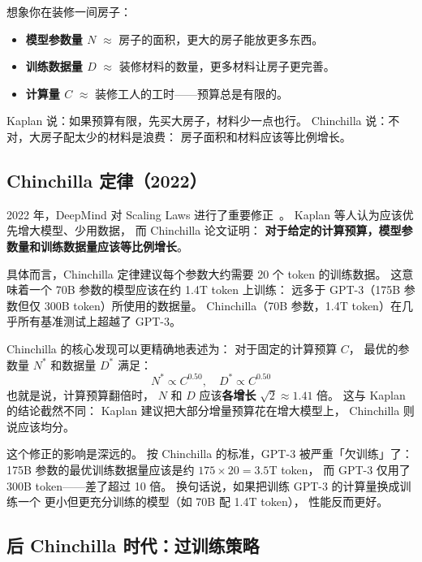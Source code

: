 \begin{keybox}
想象你在装修一间房子：
\begin{itemize}[noitemsep]
  \item \textbf{模型参数量 $N$} $\approx$ 房子的面积，更大的房子能放更多东西。
  \item \textbf{训练数据量 $D$} $\approx$ 装修材料的数量，更多材料让房子更完善。
  \item \textbf{计算量 $C$} $\approx$ 装修工人的工时——预算总是有限的。
\end{itemize}
Kaplan 说：如果预算有限，先买大房子，材料少一点也行。
Chinchilla 说：不对，大房子配太少的材料是浪费：
房子面积和材料应该等比例增长。
\end{keybox}

\subsection{Chinchilla 定律（2022）}

2022 年，DeepMind 对 Scaling Laws 进行了重要修正~\cite{hoffmann2022chinchilla}。
Kaplan 等人认为应该优先增大模型、少用数据，
而 Chinchilla 论文证明：
\textbf{对于给定的计算预算，模型参数量和训练数据量应该等比例增长}。

具体而言，Chinchilla 定律建议每个参数大约需要 20 个 token 的训练数据。
这意味着一个 70B 参数的模型应该在约 1.4T token 上训练：
远多于 GPT-3（175B 参数但仅 300B token）所使用的数据量。
Chinchilla（70B 参数，1.4T token）在几乎所有基准测试上超越了 GPT-3。

Chinchilla 的核心发现可以更精确地表述为：
对于固定的计算预算 $C$，
最优的参数量 $N^*$ 和数据量 $D^*$ 满足：
\begin{equation}
  N^* \propto C^{0.50}, \quad D^* \propto C^{0.50}
  \label{eq:chinchilla-optimal}
\end{equation}
也就是说，计算预算翻倍时，
$N$ 和 $D$ 应该\textbf{各增长} $\sqrt{2} \approx 1.41$ 倍。
这与 Kaplan 的结论截然不同：
Kaplan 建议把大部分增量预算花在增大模型上，
Chinchilla 则说应该均分。

这个修正的影响是深远的。
按 Chinchilla 的标准，GPT-3 被严重「欠训练」了：
175B 参数的最优训练数据量应该是约 $175 \times 20 = 3.5$T token，
而 GPT-3 仅用了 300B token——差了超过 10 倍。
换句话说，如果把训练 GPT-3 的计算量换成训练一个
更小但更充分训练的模型（如 70B 配 1.4T token），
性能反而更好。

\subsection{后 Chinchilla 时代：过训练策略}
\label{sec:overtraining}

